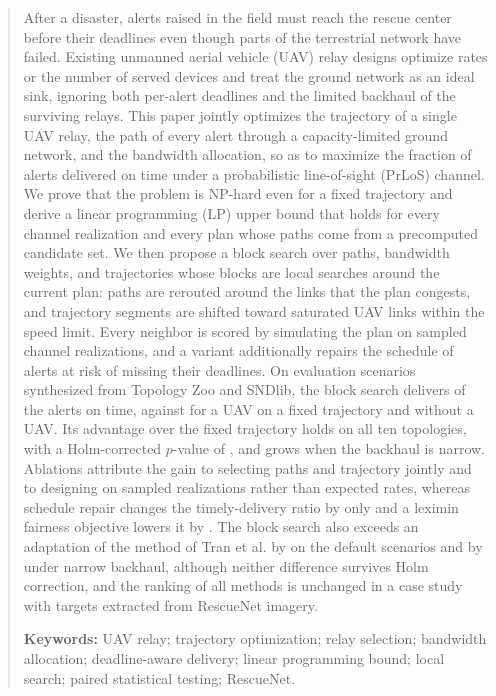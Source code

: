 \begin{abstract}
\noindent
After a disaster, alerts raised in the field must reach the rescue center before their deadlines even though parts of the terrestrial network have failed. Existing unmanned aerial vehicle (UAV) relay designs optimize rates or the number of served devices and treat the ground network as an ideal sink, ignoring both per-alert deadlines and the limited backhaul of the surviving relays. This paper jointly optimizes the trajectory of a single UAV relay, the path of every alert through a capacity-limited ground network, and the bandwidth allocation, so as to maximize the fraction of alerts delivered on time under a probabilistic line-of-sight (PrLoS) channel. We prove that the problem is NP-hard even for a fixed trajectory and derive a linear programming (LP) upper bound that holds for every channel realization and every plan whose paths come from a precomputed candidate set. We then propose a block search over paths, bandwidth weights, and trajectories whose blocks are local searches around the current plan: paths are rerouted around the links that the plan congests, and trajectory segments are shifted toward saturated UAV links within the speed limit. Every neighbor is scored by simulating the plan on sampled channel realizations, and a variant additionally repairs the schedule of alerts at risk of missing their deadlines. On \ResultTwoScenarioCount{} evaluation scenarios synthesized from Topology Zoo and SNDlib, the block search delivers \ResultTwoTimelyVzeroBtwo{} of the alerts on time, against \ResultTwoTimelyVzeroBone{} for a UAV on a fixed trajectory and \ResultTwoTimelyVzeroBzero{} without a UAV. Its advantage over the fixed trajectory holds on all ten topologies, with a Holm-corrected $p$-value of \ResultTwoHolmVzeroBtwoBone, and grows when the backhaul is narrow. Ablations attribute the gain to selecting paths and trajectory jointly and to designing on sampled realizations rather than expected rates, whereas schedule repair changes the timely-delivery ratio by only \ResultTwoDiffVzeroPBtwo{} and a leximin fairness objective lowers it by \ResultTwoDiffVzeroBtwoBthree. The block search also exceeds an adaptation of the method of Tran et al. by \ResultExtDiffVzeroBtwoTran{} on the default scenarios and by \ResultExtDiffVzeroBhfivezeroBtwoTran{} under narrow backhaul, although neither difference survives Holm correction, and the ranking of all methods is unchanged in a case study with \ResultExtTargetCount{} targets extracted from RescueNet imagery.

\vspace{0.5em}
\noindent
\textbf{Keywords:} UAV relay; trajectory optimization; relay selection; bandwidth allocation; deadline-aware delivery; linear programming bound; local search; paired statistical testing; RescueNet.
\end{abstract}
